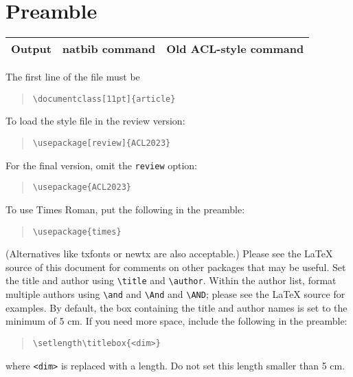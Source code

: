 \documentclass[11pt]{article}
\begin{document}
\section{Preamble}
\begin{table*}
	\centering
	\begin{tabular}{lll}
		\hline
		\textbf{Output} & \textbf{natbib command} & \textbf{Old ACL-style command} \\
		\hline
		\hline
	\end{tabular}
	\caption{\label{citation-guide}
		Citation commands supported by the style file.
		The style is based on the natbib package and supports all natbib citation commands.
		It also supports commands defined in previous ACL style files for compatibility.
	}
\end{table*}
The first line of the file must be
\begin{quote}
	\begin{verbatim}
\documentclass[11pt]{article}
\end{verbatim}
\end{quote}
To load the style file in the review version:
\begin{quote}
	\begin{verbatim}
\usepackage[review]{ACL2023}
\end{verbatim}
\end{quote}
For the final version, omit the \verb|review| option:
\begin{quote}
	\begin{verbatim}
\usepackage{ACL2023}
\end{verbatim}
\end{quote}
To use Times Roman, put the following in the preamble:
\begin{quote}
	\begin{verbatim}
\usepackage{times}
\end{verbatim}
\end{quote}
(Alternatives like txfonts or newtx are also acceptable.)
Please see the \LaTeX{} source of this document for comments on other packages that may be useful.
Set the title and author using \verb|\title| and \verb|\author|. Within the author list, format multiple authors using \verb|\and| and \verb|\And| and \verb|\AND|; please see the \LaTeX{} source for examples.
By default, the box containing the title and author names is set to the minimum of 5 cm. If you need more space, include the following in the preamble:
\begin{quote}
	\begin{verbatim}
\setlength\titlebox{<dim>}
\end{verbatim}
\end{quote}
where \verb|<dim>| is replaced with a length. Do not set this length smaller than 5 cm.
\end{document}
